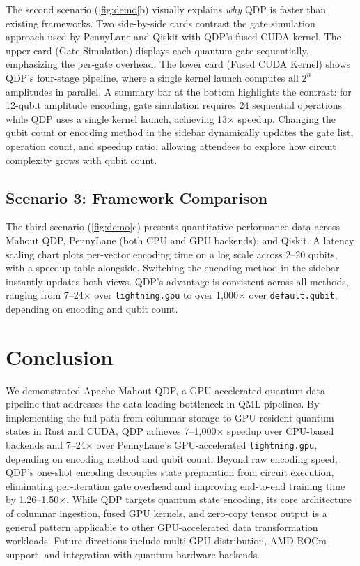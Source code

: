 \documentclass[sigconf, nonacm]{acmart}
\begin{document}
The second scenario (\autoref{fig:demo}b) visually explains \emph{why} QDP is faster than existing frameworks.
Two side-by-side cards contrast the gate simulation approach used by PennyLane and Qiskit with QDP's fused CUDA kernel.
The upper card (Gate Simulation) displays each quantum gate sequentially, emphasizing the per-gate overhead.
The lower card (Fused CUDA Kernel) shows QDP's four-stage pipeline, where a single kernel launch computes all $2^n$ amplitudes in parallel.
A summary bar at the bottom highlights the contrast: for 12-qubit amplitude encoding, gate simulation requires 24 sequential operations while QDP uses a single kernel launch, achieving 13$\times$ speedup.
Changing the qubit count or encoding method in the sidebar dynamically updates the gate list, operation count, and speedup ratio, allowing attendees to explore how circuit complexity grows with qubit count.

\subsection{Scenario 3: Framework Comparison}

The third scenario (\autoref{fig:demo}c) presents quantitative performance data across Mahout QDP, PennyLane (both CPU and GPU backends), and Qiskit.
A latency scaling chart plots per-vector encoding time on a log scale across 2--20 qubits, with a speedup table alongside.
Switching the encoding method in the sidebar instantly updates both views.
QDP's advantage is consistent across all methods, ranging from 7--24$\times$ over \texttt{lightning.gpu} to over 1{,}000$\times$ over \texttt{default.qubit}, depending on encoding and qubit count.

\section{Conclusion}

We demonstrated Apache Mahout QDP, a GPU-accelerated quantum data pipeline that addresses the data loading bottleneck in QML pipelines.
By implementing the full path from columnar storage to GPU-resident quantum states in Rust and CUDA, QDP achieves 7--1{,}000$\times$ speedup over CPU-based backends and 7--24$\times$ over PennyLane's GPU-accelerated \texttt{lightning.gpu}, depending on encoding method and qubit count.
Beyond raw encoding speed, QDP's one-shot encoding decouples state preparation from circuit execution, eliminating per-iteration gate overhead and improving end-to-end training time by 1.26--1.50$\times$.
While QDP targets quantum state encoding, its core architecture of columnar ingestion, fused GPU kernels, and zero-copy tensor output is a general pattern applicable to other GPU-accelerated data transformation workloads.
Future directions include multi-GPU distribution, AMD ROCm support, and integration with quantum hardware backends.
\end{document}
